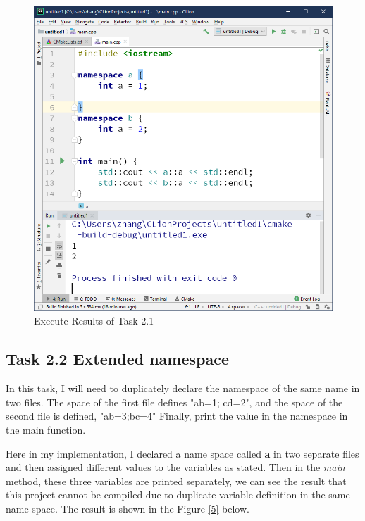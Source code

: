 \documentclass[a4paper]{report}
\begin{document}
\begin{figure}
  \centering
  \includegraphics[scale=0.5]{TwoOne.PNG}
  \caption{Execute Results of Task 2.1}\label{4}
\end{figure}

\subsection{Task 2.2 Extended namespace}
In this task, I will need to duplicately declare the namespace of the same name in two files. The space of the first file defines "ab=1; cd=2", and the space of the second file is defined, "ab=3;bc=4" Finally, print the value in the namespace in the main function.
\par
Here in my implementation, I declared a name space called \textbf{a} in two separate files and then assigned different values to the variables as stated. Then in the \emph{main} method, these three variables are printed separately, we can see the result that this project cannot be compiled due to duplicate variable definition in the same name space. The result is shown in the Figure \ref{5} below.
\end{document}
